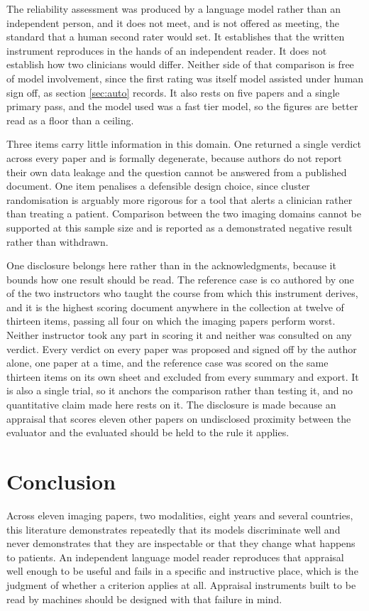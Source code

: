 \documentclass{article}
\begin{document}
The reliability assessment was produced by a language model rather than an independent person, and
it does not meet, and is not offered as meeting, the standard that a human second rater would set.
It establishes that the written instrument reproduces in the hands of an independent reader. It
does not establish how two clinicians would differ. Neither side of that comparison is free of model
involvement, since the first rating was itself model assisted under human sign off, as section \ref{sec:auto}
records. It also rests on five papers and a single primary pass, and the model used was a fast tier
model, so the figures are better read as a floor than a ceiling.

Three items carry little information in this domain. One returned a single verdict across every
paper and is formally degenerate, because authors do not report their own data leakage and the
question cannot be answered from a published document. One item penalises a defensible design
choice, since cluster randomisation is arguably more rigorous for a tool that alerts a clinician
rather than treating a patient. Comparison between the two imaging domains cannot be supported at
this sample size and is reported as a demonstrated negative result rather than withdrawn.

One disclosure belongs here rather than in the acknowledgments, because it bounds how one result
should be read. The reference case is co authored by one of the two instructors who taught the
course from which this instrument derives, and it is the highest scoring document anywhere in the
collection at twelve of thirteen items, passing all four on which the imaging papers perform worst.
Neither instructor took any part in scoring it and neither was consulted on any verdict. Every
verdict on every paper was proposed and signed off by the author alone, one paper at a time, and the
reference case was scored on the same thirteen items on its own sheet and excluded from every
summary and export. It is also a single trial, so it anchors the comparison rather than testing it,
and no quantitative claim made here rests on it. The disclosure is made because an appraisal that
scores eleven other papers on undisclosed proximity between the evaluator and the evaluated should
be held to the rule it applies.

\section{Conclusion}

Across eleven imaging papers, two modalities, eight years and several countries, this literature
demonstrates repeatedly that its models discriminate well and never demonstrates that they are
inspectable or that they change what happens to patients. An independent language model reader
reproduces that appraisal well enough to be useful and fails in a specific and instructive place,
which is the judgment of whether a criterion applies at all. Appraisal instruments built to be read
by machines should be designed with that failure in mind.
\end{document}
